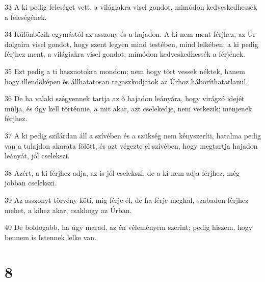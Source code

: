 \par 33 A ki pedig feleséget vett, a világiakra visel gondot, mimódon kedveskedhessék a feleségének.
\par 34 Különbözik egymástól az asszony és a hajadon. A ki nem ment férjhez, az Úr dolgaira visel gondot, hogy szent legyen mind testében, mind lelkében; a ki pedig férjhez ment, a világiakra visel gondot, mimódon kedveskedhessék a férjének.
\par 35 Ezt pedig a ti hasznotokra mondom; nem hogy tõrt vessek néktek, hanem hogy illendõképen és állhatatosan ragaszkodjatok az Úrhoz háboríthatatlanul.
\par 36 De ha valaki szégyennek tartja az õ hajadon leányára, hogy virágzó idejét múlja, és úgy kell történnie, a mit akar, azt cselekedje, nem vétkezik; menjenek férjhez.
\par 37 A ki pedig szilárdan áll a szívében és a szükség nem kényszeríti, hatalma pedig van a tulajdon akarata fölött, és azt végezte el szívében, hogy megtartja hajadon leányát, jól cselekszi.
\par 38 Azért, a ki férjhez adja, az is jól cselekszi, de a ki nem adja férjhez, még jobban  cselekszi.
\par 39 Az asszonyt törvény köti, míg férje él, de ha férje meghal, szabadon férjhez mehet, a kihez akar, csakhogy az  Úrban.
\par 40 De boldogabb, ha úgy marad, az én véleményem szerint; pedig hiszem, hogy bennem is Istennek lelke van.

\chapter{8}

